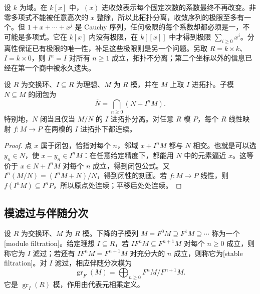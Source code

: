 \ProseParagraphBreak
设 \(k\) 为域。在 \(k[x]\) 中，\((x)\) 进收敛表示每个固定次数的系数最终不再改变。非零多项式不能被任意高次的 \(x\) 整除，所以此拓扑分离，收敛序列的极限至多有一个。但 \(1+x+\cdots+x^j\) 是 Cauchy 序列，任何极限的每个系数却都必须是一，不可能是多项式。它在 \(k[x]\) 内没有极限，在 \(k[[x]]\) 中才得到极限 \(\sum_{i\ge0}x^i\)。分离性保证已有极限的唯一性，补足这些极限则是另一个问题。另取 \(R=k\times k\)、\(I=k\times0\)，则 \(I^n=I\) 对所有 \(n\ge1\) 成立，拓扑不分离；第二个坐标以外的信息已经在第一个商中被永久遗失。

\begin{proposition}\label{b3:prop:adic-closure}
	设 \(R\) 为交换环、\(I\subseteq R\) 为理想、\(M\) 为 \(R\) 模，并在 \(M\) 上取 \(I\) 进拓扑。子模 \(N\subseteq M\) 的闭包为
	\[
		\overline N=\bigcap_{n\ge0}(N+I^nM).
	\]
	特别地，\(N\) 闭当且仅当 \(M/N\) 的 \(I\) 进拓扑分离。对任意 \(R\) 模 \(P\)，每个 \(R\) 线性映射 \(f:M\to P\) 在两模的 \(I\) 进拓扑下都连续。
\end{proposition}
\begin{proof}
	点 \(x\) 属于闭包，恰指对每个 \(n\)，邻域 \(x+I^nM\) 都与 \(N\) 相交。也就是可以选 \(y_n\in N\)，使 \(x-y_n\in I^nM\)：在任意给定精度下，都能用 \(N\) 中的元素逼近 \(x\)。这等价于 \(x\in N+I^nM\) 对每个 \(n\) 成立，得到闭包公式。又 \(I^n(M/N)=(I^nM+N)/N\)，得到闭性的刻画。若 \(f:M\rightarrow P\) 线性，则 \(f(I^nM)\subseteq I^nP\)，所以原点处连续；平移后处处连续。
\end{proof}

\subsection{模滤过与伴随分次}
\label{b3:subsec:1301:02}

\begin{definition}\label{b3:def:good-adic-filtration}
	设 \(R\) 为交换环、\(M\) 为 \(R\) 模。下降的子模列 \(M=F^0M\supseteq F^1M\supseteq\cdots\) 称为一个[module filtration]。给定理想 \(I\subseteq R\)，若 \(IF^nM\subseteq F^{n+1}M\) 对每个 \(n\ge0\) 成立，则称它为 \(I\) 滤过；若还有 \(IF^nM=F^{n+1}M\) 对充分大的 \(n\) 成立，则称它为[stable filtration]。对 \(I\) 滤过，相应伴随分次模为
	\[
		\operatorname{gr}_F(M)=\bigoplus_{n\ge0}F^nM/F^{n+1}M.
	\]
	它是 \(\operatorname{gr}_I(R)\) 模，作用由代表元相乘定义。
\end{definition}

